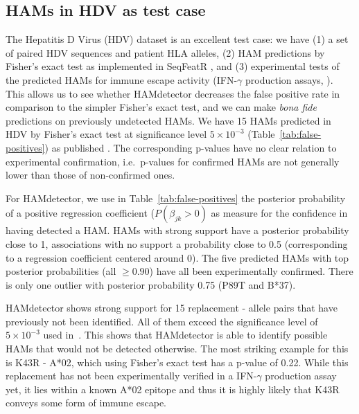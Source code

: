 \documentclass{bioinfo}
\begin{document}
\subsection{HAMs in HDV as test case}
The Hepatitis D Virus (HDV) dataset \citep{Karimzadeh2019} is an excellent test case: we have (1) a set of paired HDV sequences and patient HLA alleles, (2) HAM predictions by Fisher's exact test as implemented in SeqFeatR \citep{Budeus2016}, and (3) experimental tests of the predicted HAMs for immune escape activity (IFN-\(\gamma\) production assays, \citet{Karimzadeh2019}). This allows us to see whether HAMdetector decreases the false positive rate in comparison to the simpler Fisher's exact test, and we can make \emph{bona fide} predictions on previously undetected HAMs.
We have 15 HAMs predicted in HDV by Fisher's exact test at significance level $5\times 10^{-3}$ (Table~\ref{tab:false-positives}) as published \citep{Karimzadeh2019}. The corresponding p-values  have no clear relation to experimental confirmation, i.e.\ p-values for confirmed HAMs are not generally lower than those of non-confirmed ones.

For HAMdetector, we use in Table~\ref{tab:false-positives} the posterior probability of a positive regression coefficient ($P(\beta_{jk}>0)$ as measure for the confidence in having detected a HAM. HAMs with strong support have a posterior probability close to 1, associations with no support a probability close to 0.5 (corresponding to a regression coefficient centered around 0). The five predicted HAMs with top posterior probabilities (all $\ge 0.90$) have all been experimentally confirmed. There is only one outlier with posterior probability 0.75 (P89T and B*37).

HAMdetector shows strong support for 15 replacement - allele pairs that have previously not been identified. All of them exceed the significance level of 
$5\times 10^{-3}$ used in~\citet{Karimzadeh2019}. This shows that HAMdetector is able to identify possible HAMs that would not be detected otherwise. The most striking example for this is K43R - A*02, which using Fisher's exact test has a p-value of 0.22. While this replacement has not been experimentally verified in a IFN-\(\gamma\) production assay yet, it lies within a known A*02 epitope and thus it is highly likely that K43R conveys some form of immune escape. 
\end{document}

